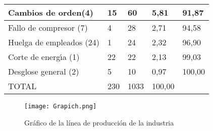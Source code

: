 \documentclass{article}
\theoremstyle{mytheoremstyle}
\theoremstyle{mytheoremstyle}
\theoremstyle{myproblemstyle}
\begin{document}
\begin{enumerate}
\begin{itemize}
\begin{table}[h!]
\begin{tabular}{|l|l|l|l|l|}
	\hline 
	\multicolumn{1}{|p{155.83218pt}}{\raggedright Cambios de orden(4)} & \multicolumn{1}{|p{61.730625pt}}{\raggedright 15} & \multicolumn{1}{|p{48.18pt}}{\raggedright 60} & \multicolumn{1}{|p{41.404686pt}}{\raggedright 5,81} & \multicolumn{1}{|p{60.225pt}|}{\raggedright 91,87}\\ 
	\hline 
	\multicolumn{1}{|p{155.83218pt}}{\raggedright Fallo de compresor (7)} & \multicolumn{1}{|p{61.730625pt}}{\raggedright 4} & \multicolumn{1}{|p{48.18pt}}{\raggedright 28} & \multicolumn{1}{|p{41.404686pt}}{\raggedright 2,71} & \multicolumn{1}{|p{60.225pt}|}{\raggedright 94,58}\\ 
	\hline 
	\multicolumn{1}{|p{155.83218pt}}{\raggedright Huelga de empleados (24)} & \multicolumn{1}{|p{61.730625pt}}{\raggedright 1} & \multicolumn{1}{|p{48.18pt}}{\raggedright 24} & \multicolumn{1}{|p{41.404686pt}}{\raggedright 2,32} & \multicolumn{1}{|p{60.225pt}|}{\raggedright 96,90}\\ 
	\hline 
	\multicolumn{1}{|p{155.83218pt}}{\raggedright Corte de energ\'{\i}a (1)} & \multicolumn{1}{|p{61.730625pt}}{\raggedright 22} & \multicolumn{1}{|p{48.18pt}}{\raggedright 22} & \multicolumn{1}{|p{41.404686pt}}{\raggedright 2,13} & \multicolumn{1}{|p{60.225pt}|}{\raggedright 99,03}\\ 
	\hline 
	\multicolumn{1}{|p{155.83218pt}}{\raggedright Desglose general (2)} & \multicolumn{1}{|p{61.730625pt}}{\raggedright 5} & \multicolumn{1}{|p{48.18pt}}{\raggedright 10} & \multicolumn{1}{|p{41.404686pt}}{\raggedright 0,97} & \multicolumn{1}{|p{60.225pt}|}{\raggedright 100,00}\\ 
	\hline 
	\multicolumn{1}{|p{155.83218pt}}{\raggedright TOTAL} & \multicolumn{1}{|p{61.730625pt}}{\raggedright 230} & \multicolumn{1}{|p{48.18pt}}{\raggedright 1033} & \multicolumn{1}{|p{41.404686pt}}{\raggedright 100,00} & \multicolumn{1}{|p{60.225pt}|}{}\\ 
	\hline 
	
	\end{tabular}
	\end{table}	
	      \begin{figure}[H]
		      \centering
		      \texttt{[image: Grapich.png]}
		      \caption{Gráfico de la línea de producción de la industria}
		      \label{fig:imagen2}
	      \end{figure}


\end{itemize}
\end{enumerate}
\end{document}
